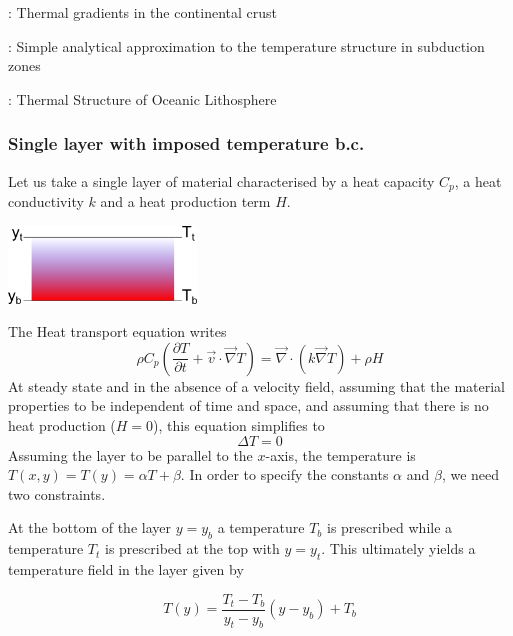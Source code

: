 
\Literature: Thermal gradients in the continental crust \cite{chap86}

\Literature: Simple analytical approximation to the temperature structure in
subduction zones \cite{enwi04}

\Literature: Thermal Structure of Oceanic Lithosphere \cite{rihc18}

\subsubsection{Single layer with imposed temperature b.c.}

Let us take a single layer of material characterised by
a heat capacity $C_p$, a heat conductivity $k$
and a heat production term $H$.

\begin{center}
\includegraphics[width=5cm]{images/initial_temperature/tempcond.png}
\end{center}

The Heat transport equation writes
\begin{equation}
\rho C_p \left( \frac{\partial T}{\partial t} + {\vec v} \cdot {\vec \nabla} { T} \right) = 
{\vec \nabla} \cdot (k {\vec \nabla} T) + \rho H
\end{equation}
At steady state and in the absence of a velocity field, assuming
that the material properties to be independent of time and space, and 
assuming that
there is no heat production ($H=0$), this equation
simplifies to
\begin{equation}
\Delta T =0 
\end{equation}
Assuming the layer to be parallel to the $x$-axis, the temperature is
$T(x,y)=T(y)=\alpha T+ \beta$. 
In order to specify the constants $\alpha$ and $\beta$, we need two constraints.

At the bottom of the layer $y=y_b$ a temperature $T_b$ is prescribed while a temperature
$T_t$ is prescribed at the top with $y=y_t$. This ultimately yields a temperature field in
the layer given by
\begin{mdframed}[backgroundcolor=blue!5]
\[
T(y) = \frac{T_t-T_b}{y_t-y_b}(y-y_b) + T_b
\]
\end{mdframed}

